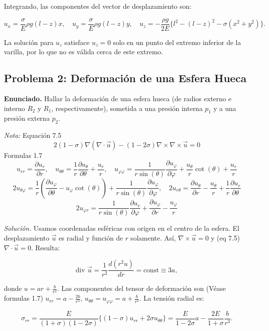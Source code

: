 \documentclass{article}
\begin{document}
Integrando, las componentes del vector de desplazamiento son:

$$
u_x = \frac{\sigma}{E}\rho g(l - z)x, \quad u_y = \frac{\sigma}{E}\rho g(l - z)y, \quad u_z = -\frac{\rho g}{2E} \{l^2 - (l - z)^2 - \sigma(x^2 + y^2)\}.
$$

La solución para $u_z$ satisface $u_z = 0$ solo en un punto del extremo inferior de la varilla, por lo que no es válida cerca de este extremo.

\subsection*{Problema 2: Deformación de una Esfera Hueca}
\textbf{Enunciado.} Hallar la deformación de una esfera hueca (de radios externo e interno $R_2$ y $R_1$, respectivamente), sometida a una presión interna $p_1$ y a una presión externa $p_2$.

\textit{Nota:} Equación 7.5 $$2(1-\sigma)\nabla(\nabla \cdot \vec{u}) - (1-2\sigma)\nabla \times \nabla \times \vec{u} = 0$$
Formulas 1.7 $$ u_{rr} = \frac{\partial u_r}{\partial r}, \quad u_{\theta \theta} = \frac{1}{r}\frac{\partial u_\theta}{\partial \theta} + \frac{u_r}{r}, \quad u_{\varphi \varphi} = \frac{1}{r\sin(\theta)}\frac{\partial u_\varphi}{\partial \varphi} + \frac{u_\theta}{r}\cot(\theta) + \frac{u_r}{r} $$
$$ 2u_{\theta \varphi} = \frac{1}{r}\left(\frac{\partial u_\varphi}{\partial \theta}- u_\varphi \cot(\theta)\right) + \frac{1}{r\sin(\theta)}\frac{\partial u_\varphi}{\partial \varphi}, \quad 2u_{r\theta} = \frac{\partial u_\theta }{\partial r}-\frac{u_\theta}{r} + \frac{1}{r}\frac{\partial u_r }{\partial \theta}$$
$$ 2u_{\varphi r}=\frac{1}{r\sin(\theta)}\frac{\partial u_r}{\partial \varphi}+\frac{\partial u_\varphi}{\partial r}-\frac{u_\varphi}{r} $$

\textit{Solución.} Usamos coordenadas esféricas con origen en el centro de la esfera. El desplazamiento $\vec{u}$ es radial y función de $r$ solamente. Así, $\nabla \times \vec{u} = 0$ y (eq 7.5)$\nabla \cdot \vec{u} = 0$. Resulta:

$$
\text{div } \vec{u} = \frac{1}{r^2} \frac{d(r^2 u)}{dr} = \text{const} \equiv 3a,
$$

donde $u = ar + \frac{b}{r^2}$. Las componentes del tensor de deformación son (Véase formulas 1.7) $u_{rr} = a - \frac{2b}{r^3}$, $u_{\theta\theta} = u_{\varphi\varphi} = a + \frac{b}{r^3}$. La tensión radial es:

$$
\sigma_{rr} = \frac{E}{(1+\sigma)(1-2\sigma)} \{(1-\sigma)u_{rr} + 2\sigma u_{\theta\theta}\} = \frac{E}{1-2\sigma} a - \frac{2E}{1+\sigma} \frac{b}{r^3}.
$$
\end{document}
